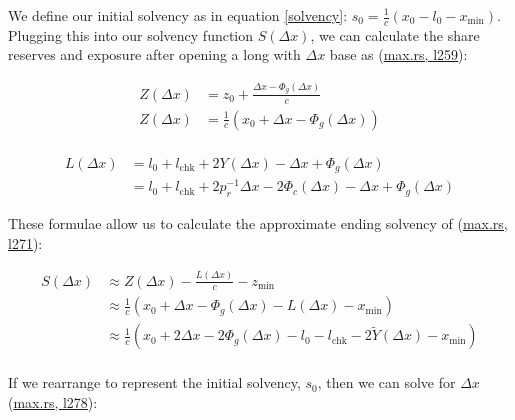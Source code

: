 We define our initial solvency as in equation \eqref{solvency}:
$s_{0} = \tfrac{1}{c} \left(x_{0} - l_{0} - x_{\text{min}} \right)$.
Plugging this into our solvency function $S(\Delta x)$, we can calculate the share reserves and exposure after opening a long with $\Delta x$ base as (\href{https://github.com/delvtech/hyperdrive/blob/f410574fffcb8b2556208c158494ba2972525843/crates/hyperdrive-math/src/long/max.rs#L259}{max.rs, l259}):

\begin{equation}
\begin{aligned}
Z(\Delta x) &= z_0 + \tfrac{\Delta x - \Phi_{g}(\Delta x)}{c} \\
Z(\Delta x) &= \tfrac{1}{c} \left( x_0 + \Delta x - \Phi_{g}(\Delta x) \right) \\
\end{aligned}
\end{equation}

\begin{equation}
\begin{aligned}
L(\Delta x) &= l_0 + l_{\text{chk}} + 2 Y(\Delta x) - \Delta x + \Phi_{g}(\Delta x) \\
&= l_0 + l_{\text{chk}} + 2 p_{r}^{-1} \Delta x - 2 \Phi_{c}(\Delta x) - \Delta x + \Phi_{g}(\Delta x)
\end{aligned}
\end{equation}

These formulae allow us to calculate the approximate ending solvency of (\href{https://github.com/delvtech/hyperdrive/blob/f410574fffcb8b2556208c158494ba2972525843/crates/hyperdrive-math/src/long/max.rs#L271}{max.rs, l271}):

\begin{equation}
\begin{aligned}
S(\Delta x) &\approx Z(\Delta x) - \tfrac{L(\Delta x)}{c} - z_{\text{min}} \\
&\approx \tfrac{1}{c} \left( x_0 + \Delta x - \Phi_{g}(\Delta x) - L(\Delta x) - x_{\text{min}} \right) \\
&\approx \tfrac{1}{c} \left( x_0 + 2 \Delta x - 2 \Phi_{g}(\Delta x) - l_{0} - l_{\text{chk}} - 2\tilde{Y}(\Delta x) - x_{\text{min}} \right) \\
\end{aligned}
\end{equation}

If we rearrange to represent the initial solvency, $s_0$, then we can solve for $\Delta x$ (\href{https://github.com/delvtech/hyperdrive/blob/f410574fffcb8b2556208c158494ba2972525843/crates/hyperdrive-math/src/long/max.rs#L278}{max.rs, l278}):


